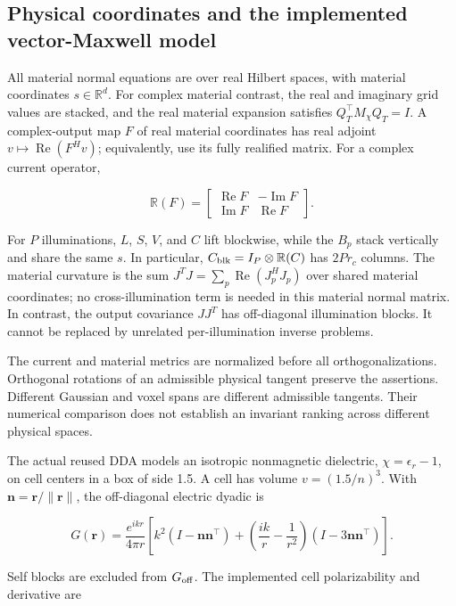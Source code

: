 
\subsection*{Physical coordinates and the implemented vector-Maxwell model}

All material normal equations are over real Hilbert spaces, with material coordinates \(s\in\mathbb R^d\). For complex material contrast, the real and imaginary grid values are stacked, and the real material expansion satisfies \(Q_T^\top M_\chi Q_T=I\). A complex-output map \(F\) of real material coordinates has real adjoint \(v\mapsto\operatorname{Re}(F^Hv)\); equivalently, use its fully realified matrix. For a complex current operator,

\[
\mathbb R(F)=\begin{bmatrix}\operatorname{Re}F&-\operatorname{Im}F\\
\operatorname{Im}F&\operatorname{Re}F\end{bmatrix}.
\]

For \(P\) illuminations, \(L\), \(S\), \(V\), and \(C\) lift blockwise, while the \(B_p\) stack vertically and share the same \(s\). In particular, \(C_{\rm blk}=I_P\otimes\mathbb R(C)\) has \(2Pr_c\) columns. The material curvature is the sum $J^TJ=\sum_p\operatorname{Re}(J_p^HJ_p)$ over shared material coordinates; no cross-illumination term is needed in this material normal matrix. In contrast, the output covariance $JJ^T$ has off-diagonal illumination blocks. It cannot be replaced by unrelated per-illumination inverse problems.

The current and material metrics are normalized before all orthogonalizations. Orthogonal rotations of an admissible physical tangent preserve the assertions. Different Gaussian and voxel spans are different admissible tangents. Their numerical comparison does not establish an invariant ranking across different physical spaces.

The actual reused DDA models an isotropic nonmagnetic dielectric, \(\chi=\epsilon_r-1\), on cell centers in a box of side 1.5. A cell has volume \(v=(1.5/n)^3\). With \(\boldsymbol n=\boldsymbol r/\|\boldsymbol r\|\), the off-diagonal electric dyadic is

\[
G(\boldsymbol r)=\frac{e^{ikr}}{4\pi r}
\left[k^2(I-\boldsymbol n\boldsymbol n^\top)
+\left(\frac{ik}{r}-\frac1{r^2}\right)(I-3\boldsymbol n\boldsymbol n^\top)\right]. \tag{S1}
\]

Self blocks are excluded from \(G_{\rm off}\). The implemented cell polarizability and derivative are

